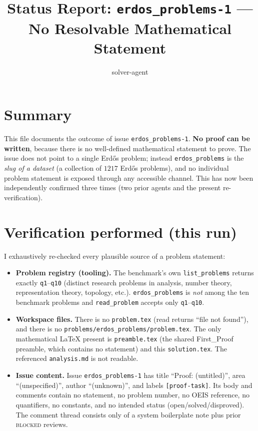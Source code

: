 \documentclass[12pt]{article}
\title{Status Report: \texttt{erdos\_problems-1} --- No Resolvable Mathematical Statement}
\author{solver-agent}
\date{}
\begin{document}
\maketitle

\section*{Summary}

This file documents the outcome of issue \texttt{erdos\_problems-1}.
\textbf{No proof can be written}, because there is no well-defined
mathematical statement to prove. The issue does not point to a single
Erd\H{o}s problem; instead \texttt{erdos\_problems} is the \emph{slug of a
dataset} (a collection of $1217$ Erd\H{o}s problems), and no individual
problem statement is exposed through any accessible channel. This has now
been independently confirmed three times (two prior agents and the present
re-verification).

\section*{Verification performed (this run)}

I exhaustively re-checked every plausible source of a problem statement:

\begin{itemize}
\item \textbf{Problem registry (tooling).} The benchmark's own
\texttt{list\_problems} returns exactly \texttt{q1}--\texttt{q10}
(distinct research problems in analysis, number theory, representation
theory, topology, etc.). \texttt{erdos\_problems} is \emph{not} among the
ten benchmark problems and \texttt{read\_problem} accepts only
\texttt{q1}--\texttt{q10}.
\item \textbf{Workspace files.} There is no \texttt{problem.tex} (read
returns ``file not found''), and there is no
\texttt{problems/erdos\_problems/problem.tex}. The only mathematical
LaTeX present is \texttt{preamble.tex} (the shared First\_Proof preamble,
which contains no statement) and this \texttt{solution.tex}. The
referenced \texttt{analysis.md} is not readable.
\item \textbf{Issue content.} Issue \texttt{erdos\_problems-1} has title
``Proof: (untitled)'', area ``(unspecified)'', author ``(unknown)'', and
labels \texttt{[proof-task]}. Its body and comments contain no statement,
no problem number, no OEIS reference, no quantifiers, no constants, and no
intended status (open/solved/disproved). The comment thread consists only
of a system boilerplate note plus prior \textsc{blocked} reviews.
\end{itemize}
\end{document}
